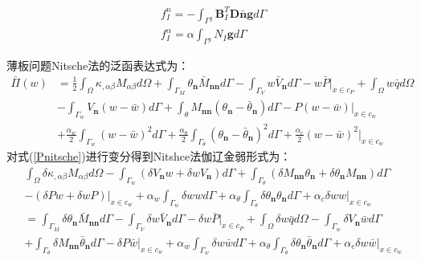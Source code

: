 \begin{equation}
\begin{split}    
   &f^n_I=-\int_{\Gamma^g}\pmb{B}_I^T\pmb{D}\bar{\pmb{n}}\pmb{g}d\Gamma\\
   &f^{\alpha}_I=\alpha\int_{\Gamma^g}N_I\pmb{g}d\Gamma
\end{split}
\end{equation}\par
薄板问题Nitsche法的泛函表达式为：
\begin{equation}\label{Pnitsche}
\begin{split}
    \bar{\Pi}(w)&=\frac{1}{2}\int_{\Omega}\kappa_{,\alpha\beta}M_{\alpha\beta}d\Omega+\int_{\Gamma_M}\theta_{\pmb{n}}\bar{M}_{\pmb{nn}}d\Gamma-\int_{\Gamma_V}w\bar{V}_{\pmb{n}}d\Gamma-w\bar{P}\vert_{x\in c_P}+\int_{\Omega}w\bar{q}d\Omega\\
&-\int_{\Gamma_w}V_{\pmb{n}}(w-\bar{w})d\Gamma+\int_{\theta}M_{\pmb{nn}}(\theta_{\pmb{n}}-\bar{\theta}_{\pmb{n}})d\Gamma-P(w-\bar{w})\vert_{x\in c_w}\\
&+\frac{\alpha_w}{2}\int_{\Gamma_w}(w-\bar{w})^2d\Gamma+\frac{\alpha_{\theta}}{2}\int_{\Gamma_{\theta}}(\theta_{\pmb{n}}-\bar{\theta}_{\pmb{n}})^2d\Gamma+\frac{\alpha_c}{2}(w-\bar{w})^2\vert_{x\in c_w}
\end{split}
\end{equation}
对式(\ref{Pnitsche})进行变分得到Nitshce法伽辽金弱形式为：
\begin{equation}
\begin{split}
&\int_{\Omega}\delta\kappa_{,\alpha\beta}M_{\alpha\beta}d\Omega-\int_{\Gamma_w}(\delta V_{\pmb{n}}w+\delta wV_{\pmb{n}})d\Gamma+\int_{\Gamma_{\theta}}(\delta M_{\pmb{nn}}\theta_{\pmb{n}}+\delta\theta_{\pmb{n}}M_{\pmb{nn}})d\Gamma\\&-(\delta Pw+\delta wP)\vert_{x\in c_w}
+\alpha_w\int_{\Gamma_w}\delta wwd\Gamma+\alpha_{\theta}\int_{\Gamma_{\theta}}\delta\theta_{\pmb{n}}\theta_{\pmb{n}}d\Gamma+\alpha_c\delta ww\vert_{x\in c_w}\\
&=\int_{\Gamma_M}\delta\theta_{\pmb{n}}\bar{M}_{\pmb{nn}}d\Gamma-\int_{\Gamma_V}\delta w\bar{V}_{\pmb{n}}d\Gamma-\delta w\bar{P}\vert_{x\in c_P}+\int_{\Omega}\delta w\bar{q}d\Omega
-\int_{\Gamma_w}\delta V_{\pmb{n}}\bar{w}d\Gamma\\&+\int_{\Gamma_{\theta}}\delta M_{\pmb{nn}}\bar{\theta}_{\pmb{n}}d\Gamma-\delta P\bar{w}\vert_{x\in c_w}
+\alpha_w\int_{\Gamma_w}\delta w\bar{w}d\Gamma+\alpha_{\theta}\int_{\Gamma_{\theta}}\delta\theta_{\pmb{n}}\bar{\theta}_{\pmb{n}}d\Gamma+\alpha_c\delta w\bar{w}\vert_{x\in c_w}
\end{split}
\end{equation}\par
